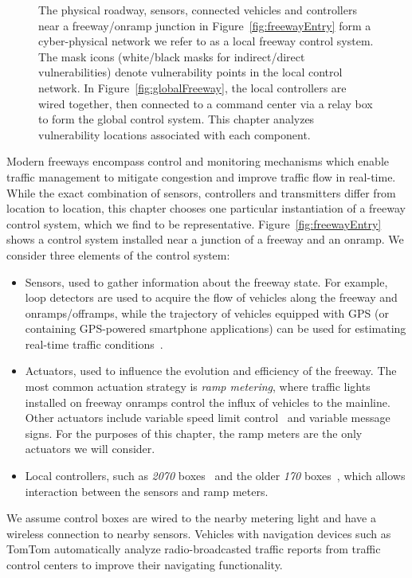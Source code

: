 	\begin{figure}

	\hfill
	\caption[Local and global freeway control system architectures with labeled vulnerability points.]{The physical roadway, sensors, connected vehicles and controllers near a freeway/onramp junction in Figure~\ref{fig:freewayEntry} form a cyber-physical network we refer to as a local freeway control system. The mask icons (white/black masks for indirect/direct vulnerabilities) denote vulnerability points in the local control network.  In Figure~\ref{fig:globalFreeway}, the local controllers are wired together, then connected to a command center via a relay box to form the global control system. This chapter analyzes vulnerability locations associated with each component.}
	\end{figure}
    		Modern freeways encompass control and monitoring mechanisms which enable traffic management to mitigate congestion and improve traffic flow in real-time. While the exact combination of sensors, controllers and transmitters differ from location to location, this chapter chooses one particular instantiation of a freeway control system, which we find to be representative. Figure~\ref{fig:freewayEntry} shows a control system installed near a junction of a freeway and an onramp. We consider three elements of the control system:
    		\begin{itemize}
    			\item Sensors, used to gather information about the freeway state. For example, loop detectors are used to acquire the flow of vehicles along the freeway and onramps/offramps, while the trajectory of vehicles equipped with GPS (or containing GPS-powered smartphone applications) can be used for estimating real-time traffic conditions~\cite{work2010traffic}.
    			\item Actuators, used to influence the evolution and efficiency of the freeway. The most common actuation strategy is \emph{ramp metering}, where traffic lights installed on freeway onramps control the influx of vehicles to the mainline. Other actuators include variable speed limit control~\cite{Muralidharana} and variable message signs. For the purposes of this chapter, the ramp meters are the only actuators we will consider.
    			\item Local controllers, such as \emph{2070} boxes~\cite{AASHTO2012} and the older \emph{170} boxes~\cite{FHWA1978}, which allows interaction between the sensors and ramp meters.
    		\end{itemize}
    		We assume control boxes are wired to the nearby metering light and have a wireless connection to nearby sensors. Vehicles with navigation devices such as TomTom automatically analyze radio-broadcasted traffic reports from traffic control centers to improve their navigating functionality.
    
